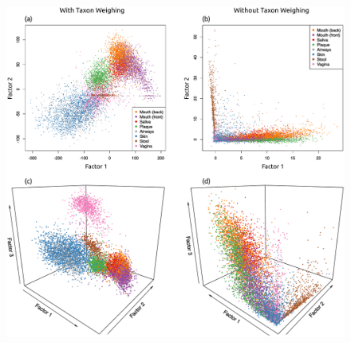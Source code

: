\clearpage


\begin{figure}[!htb]
    \centering
     \includegraphics[width=\linewidth]{pdf/hmp_pf_all_ordination.pdf}
    \begin{subfigure}{0pt}
        \label{supp:fig:hmp_pf_all_ordination:sub:2d_with_taxon_weighting}
    \end{subfigure}
    \begin{subfigure}{0pt}
        \label{supp:fig:hmp_pf_all_ordination:sub:2d_without_taxon_weighting}
    \end{subfigure}
    \begin{subfigure}{0pt}
        \label{supp:fig:hmp_pf_all_ordination:sub:3d_with_taxon_weighting}
    \end{subfigure}
    \begin{subfigure}{0pt}
        \label{supp:fig:hmp_pf_all_ordination:sub:3d_without_taxon_weighting}
    \end{subfigure}

\end{figure}
